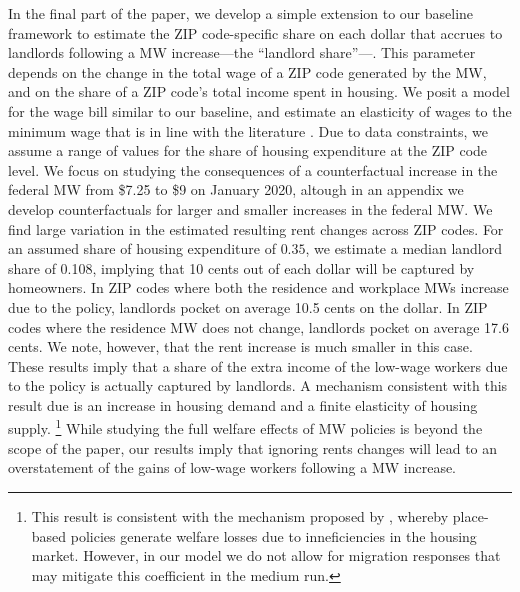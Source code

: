 In the final part of the paper, we develop a simple extension to our baseline 
framework to estimate the ZIP code-specific share on each dollar that accrues to 
landlords following a MW increase---the ``landlord share''---.
This parameter depends on the change in the total wage of a ZIP code generated
by the MW, and on the share of a ZIP code's total income spent in housing.
We posit a model for the wage bill similar to our baseline, and estimate an 
elasticity of wages to the minimum wage that is in line with the literature
\parencite[e.g.,][]{CegnizEtAl2019}.
Due to data constraints, we assume a range of values for the share of housing
expenditure at the ZIP code level.
We focus on studying the consequences of a counterfactual increase in the federal 
MW from \$7.25 to \$9 on January 2020, altough in an appendix we develop 
counterfactuals for larger and smaller increases in the federal MW.
We find large variation in the estimated resulting rent changes across ZIP codes.
For an assumed share of housing expenditure of $0.35$, we estimate a median
landlord share of 0.108, implying that 10 cents out of each dollar will be 
captured by homeowners.
In ZIP codes where both the residence and workplace MWs increase due to the 
policy, landlords pocket on average 10.5 cents on  the dollar.
In ZIP codes where the residence MW does not change, landlords pocket on average
17.6 cents.
We note, however, that the rent increase is much smaller in this case.
These results imply that a share of the extra income of the low-wage workers
due to the policy is actually captured by landlords.
A mechanism consistent with this result due is an increase in housing 
demand and a finite elasticity of housing supply.%
\footnote{This result is consistent with the mechanism proposed by 
\textcite{KlineMoretti2014}, whereby place-based policies generate welfare 
losses due to inneficiencies in the housing market.
However, in our model we do not allow for migration responses that may mitigate 
this coefficient in the medium run.}
While studying the full welfare effects of MW policies is beyond the scope of 
the paper, our results imply that ignoring rents changes will lead to an 
overstatement of the gains of low-wage workers following a MW increase.


